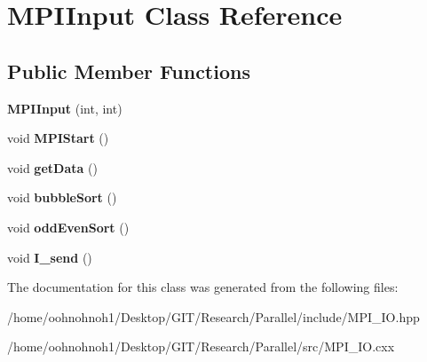 \hypertarget{classMPIInput}{}\section{M\+P\+I\+Input Class Reference}
\label{classMPIInput}
\subsection*{Public Member Functions}
\begin{DoxyCompactItemize}
\item 
\mbox{\label{classMPIInput_aad9097968754daede74b4e9931f58c8a}} 
{\bfseries M\+P\+I\+Input} (int, int)
\item 
\mbox{\label{classMPIInput_a5204b6d3bea6d1d6110b6d180da43e07}} 
void {\bfseries M\+P\+I\+Start} ()
\item 
\mbox{\label{classMPIInput_ab573f01916c4e35072009b95602a1399}} 
void {\bfseries get\+Data} ()
\item 
\mbox{\label{classMPIInput_a03c8faee4d48167f2ab33b52fad7e5ea}} 
void {\bfseries bubble\+Sort} ()
\item 
\mbox{\label{classMPIInput_a1c6165f90d30a3988eba3b9cea5afefa}} 
void {\bfseries odd\+Even\+Sort} ()
\item 
\mbox{\label{classMPIInput_ab90ddedf8faad1bfeb850d6303af50a5}} 
void {\bfseries I\+\_\+send} ()
\end{DoxyCompactItemize}


The documentation for this class was generated from the following files\+:\begin{DoxyCompactItemize}
\item 
/home/oohnohnoh1/\+Desktop/\+G\+I\+T/\+Research/\+Parallel/include/M\+P\+I\+\_\+\+I\+O.\+hpp\item 
/home/oohnohnoh1/\+Desktop/\+G\+I\+T/\+Research/\+Parallel/src/M\+P\+I\+\_\+\+I\+O.\+cxx\end{DoxyCompactItemize}
